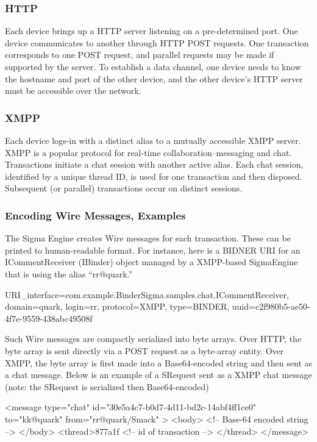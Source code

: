 \documentclass[prodmode]{acmlarge}
\begin{document}
\subsubsection{HTTP}
Each device brings up a HTTP server listening on a pre-determined port. One device communicates to another through HTTP POST requests. One transaction corresponds to one POST request, and parallel requests may be made if supported by the server. To establish a data channel, one device needs to know the hostname and port of the other device, and the other device's HTTP server must be accessible over the network.

\subsubsection{XMPP}
Each device logs-in with a distinct alias to a mutually accessible XMPP server. XMPP is a popular protocol for real-time collaboration--messaging and chat. Transactions initiate a chat session with another active alias. Each chat session, identified by a unique thread ID, is used for one transaction and then disposed. Subsequent (or parallel) transactions occur on distinct sessions.

\subsubsection{Encoding Wire Messages, Examples}
The Sigma Engine creates Wire messages for each transaction. These can be printed to human-readable format. For instance, here is a BIDNER URI for an ICommentReceiver (IBinder) object managed by a XMPP-based SigmaEngine that is using the alias ``rr@quark.''

\begin{snippet}
URI{_interface=com.example.BinderSigma.samples.chat.ICommentReceiver,
domain=quark, login=rr, protocol=XMPP, type=BINDER,
uuid=c2f980b5-ae50-4f7e-9559-438abc49508f}
\end{snippet}

Such Wire messages are compactly serialized into byte arrays. Over HTTP, the byte array is sent directly via a POST request as a byte-array entity. Over XMPP, the byte array is first made into a Base64-encoded string and then sent as a chat message. Below is an example of a SRequest sent as a XMPP chat message (note: the SRequest is serialized then Base64-encoded)

\begin{snippet}
<message type="chat" id="30e5a4c7-b0d7-4d11-bd2c-14abf4ff1ce0"
        to="kk@quark" from="rr@quark/Smack" >
        <body> <!-- Base-64 encoded string --> </body>
        <thread>877a1f <!-- id of transaction --> </thread>
        </message>
\end{snippet}
\end{document}
